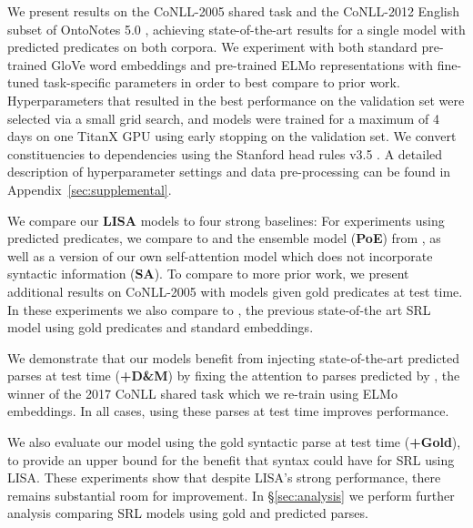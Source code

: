 \documentclass[11pt,a4paper]{article}
\begin{document}
We present results on the CoNLL-2005 shared task \citep{carreras2005introduction} and the CoNLL-2012 English subset of OntoNotes 5.0 \citep{pradhan2013towards}, achieving state-of-the-art results for a single model with predicted predicates on both corpora. We experiment with both standard pre-trained GloVe word embeddings \citep{pennington2014glove} and pre-trained ELMo representations with fine-tuned task-specific parameters \citep{peters2018deep} in order to best compare to prior work. Hyperparameters that resulted in the best performance on the validation set were selected via a small grid search, and models were trained for a maximum of 4 days on one TitanX GPU using early stopping on the validation set.
We convert constituencies to dependencies using the Stanford head rules v3.5 \citep{deMarneffe2008}. A detailed description of hyperparameter settings and data pre-processing can be found in Appendix~\ref{sec:supplemental}.


We compare our {\bf LISA} models to four strong baselines: For experiments using predicted predicates, we compare to \citet{he2018jointly} and the ensemble model ({\bf PoE}) from \citet{he2017deep}, as well as a version of our own self-attention model which does not incorporate syntactic information ({\bf SA}). To compare to more prior work, we present additional results on CoNLL-2005 with models given gold predicates at test time. In these experiments we also compare to \citet{tan2018deep}, the previous state-of-the art SRL model using gold predicates and standard embeddings.

We demonstrate that our models benefit from injecting state-of-the-art predicted parses at test time ({\bf +D\&M}) by fixing the attention to parses predicted by \citet{dozat2017deep}, the winner of the 2017 CoNLL shared task \citep{zeman2017conll} which we re-train using ELMo embeddings. In all cases, using these parses at test time improves performance. 

We also evaluate our model using the gold syntactic parse at test time ({\bf +Gold}), to provide an upper bound for the benefit that syntax could have for SRL using LISA. These experiments show that despite LISA's strong performance, there remains substantial room for improvement. In \S\ref{sec:analysis} we perform further analysis comparing SRL models using gold and predicted parses.
\end{document}
